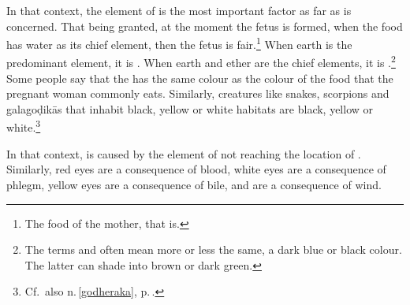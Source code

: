 \begin{translation}
In that context, the element of  is the most important
factor as far as  is concerned. That being
granted, at the moment the fetus is formed, when the food has water as
its chief element, then the fetus is fair.\footnote{The food of the
    mother, that is.}  When earth is the predominant element, it is
    . When earth and ether are the chief elements, it is
    .\footnote{The terms  and 
        often mean more or less the same, a dark blue or black colour. The
        latter can shade into brown or dark green.}  Some people say that the
         has the same colour as the colour of the food
        that the pregnant woman commonly eats. Similarly, creatures like
        snakes, scorpions and \glspl{galagoḍikā} that inhabit black, yellow or
        white habitats are black, yellow or
        white.\footnote{\label{galagodika}Cf.\ also n.\,\ref{godheraka},
            p.\,\pageref{godheraka}.} 
            
            In that context,  is
caused by the element of  not
reaching the location of .  Similarly, red
eyes are a consequence of blood, white eyes are a
consequence of phlegm, yellow eyes are a consequence of
bile, and  are a
consequence of wind.
  



\end{translation}
